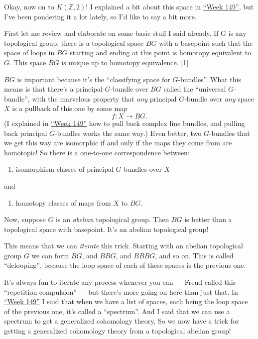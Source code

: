 \documentclass{article}
\def\tightlist{}
\begin{document}
Okay, now on to \(K(\mathbb{Z},2)\)! I explained a bit about this space
in \protect\hyperlink{week149}{``Week 149''}, but I've been pondering it
a lot lately, so I'd like to say a bit more.

First let me review and elaborate on some basic stuff I said already. If
G is any topological group, there is a topological space \(BG\) with a
basepoint such that the space of loops in \(BG\) starting and ending at
this point is homotopy equivalent to \(G\). This space \(BG\) is unique
up to homotopy equivalence. {[}1{]}

\(BG\) is important because it's the ``classifying space for
\(G\)-bundles''. What this means is that there's a principal
\(G\)-bundle over \(BG\) called the ``universal \(G\)-bundle'', with the
marvelous property that \emph{any} principal \(G\)-bundle over
\emph{any} space \(X\) is a pullback of this one by some map
\[f\colon X \to BG.\] (I explained in \protect\hyperlink{week149}{``Week
149''} how to pull back complex line bundles, and pulling back principal
\(G\)-bundles works the same way.) Even better, two \(G\)-bundles that
we get this way are isomorphic if and only if the maps they come from
are homotopic! So there is a one-to-one correspondence between:

\begin{enumerate}
\def\labelenumi{\Alph{enumi})}
\tightlist
\item
  isomorphism classes of principal \(G\)-bundles over \(X\)
\end{enumerate}

and

\begin{enumerate}
\def\labelenumi{\Alph{enumi})}
\setcounter{enumi}{1}
\tightlist
\item
  homotopy classes of maps from \(X\) to \(BG\).
\end{enumerate}

Now, suppose \(G\) is an \emph{abelian} topological group. Then \(BG\)
is better than a topological space with basepoint. It's an abelian
topological group!

This means that we can \emph{iterate} this trick. Starting with an
abelian topological group \(G\) we can form \(BG\), and \(BBG\), and
\(BBBG\), and so on. This is called ``delooping'', because the loop
space of each of these spaces is the previous one.

It's always fun to iterate any process whenever you can --- Freud called
this ``repetition compulsion'' --- but there's more going on here than
just that. In \protect\hyperlink{week149}{``Week 149''} I said that when
we have a list of spaces, each being the loop space of the previous one,
it's called a ``spectrum''. And I said that we can use a spectrum to get
a generalized cohomology theory. So we now have a trick for getting a
generalized cohomology theory from a topological abelian group!
\end{document}
